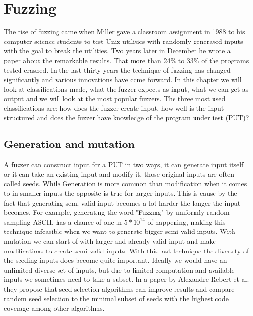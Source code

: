 \chapter{Fuzzing}
\label{cha:2:fuzzing}
The rise of fuzzing came when Miller gave a classroom assignment\cite{21FuzzingAssignment} in 1988 to his computer science students to test Unix utilities with randomly generated inputs with the goal to break the utilities. Two years later in December he wrote a paper\cite{4originalFuzzingUnixUtils} about the remarkable results. That more than 24\% to 33\% of the programs tested crashed.
In the last thirty years the technique of fuzzing has changed significantly and various innovations have come forward. In this chapter we will look at classifications made, what the fuzzer expects as input, what we can get as output and we will look at the most popular fuzzers.
The three\cite{12Fuzzingasurvey}\cite{13manes2019survey} most used classifications are: how does the fuzzer create input, how well is the input structured and does the fuzzer have knowledge of the program under test (PUT)?

\section{Generation and mutation}
A fuzzer can construct input for a PUT in two ways, it can generate input itself or it can take an existing input and modify it, those original inputs are often called seeds. While Generation is more common than modification when it comes to in smaller inputs the opposite is true for larger inputs. This is cause by the fact that generating semi-valid input becomes a lot harder the longer the input becomes. For example, generating the word "Fuzzing" by uniformly random sampling ASCII, has a chance of one in $5*10^{14}$ of happening, making this technique infeasible when we want to generate bigger semi-valid inputs. With mutation we can start of with larger and already valid input and make modifications to create semi-valid inputs. With this last technique the diversity of the seeding inputs does become quite important. Ideally we would have an unlimited diverse set of inputs, but due to limited computation and available inputs we sometimes need to take a subset. In a paper by Alexandre Rebert et al. \cite{14rebert2014seedselecting} they propose that seed selection algorithms can improve results and compare random seed selection to the minimal subset of seeds with the highest code coverage among other algorithms. 

